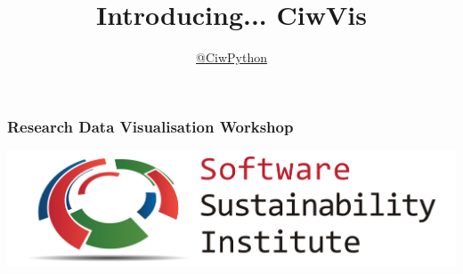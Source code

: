 \documentclass[xcolor={table}]{beamer}
\title{Introducing... CiwVis}
\author{\href{https://twitter.com/CiwPython}{@CiwPython}}
\date{}
\begin{document}
\frame{\titlepage}

\begin{frame}
  \frametitle{Research Data Visualisation Workshop}
  \begin{center}
    \includegraphics[width=\textwidth]{ssilogo}
  \end{center}
\end{frame}
\end{document}
